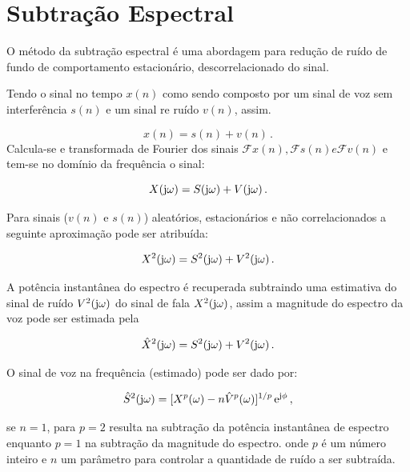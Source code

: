 \section{Subtração Espectral}
\label{secspec}
O método da subtração espectral é uma abordagem para redução de ruído de fundo de comportamento estacionário, descorrelacionado do sinal. 

Tendo o sinal no tempo $x(n)$ como sendo composto por um sinal de voz sem interferência $s(n)$ e um sinal re ruído $v(n)$, assim.

\begin{equation}
    x(n) = s(n)+v(n) \,.
    \label{eq1}
\end{equation}
\noindent
Calcula-se e transformada de Fourier dos sinais $\mathscr{F}{x(n)}, \mathscr{F}{s(n)} e\mathscr{F}{v(n)}   $ e tem-se no domínio da frequência o sinal: 

\begin{equation}
    X(\operatorname{j\!} \omega) = S(\operatorname{j\!} \omega)+V(\operatorname{j\!} \omega) \,.
    \label{eq2}
\end{equation}

Para sinais ($v(n)$ e $s(n)$) aleatórios, estacionários e não correlacionados a seguinte aproximação pode ser atribuída:

\begin{equation}
    X^2(\operatorname{j\!} \omega) = S^2(\operatorname{j\!} \omega)+V^2(\operatorname{j\!} \omega) \,.
    \label{eq3}
\end{equation}

A potência instantânea do espectro é recuperada subtraindo uma estimativa do sinal de ruído $V^2(\operatorname{j\!} \omega)$ do sinal de fala $X^2(\operatorname{j\!} \omega)$, assim a magnitude do espectro da voz pode ser estimada pela 

\begin{equation}
   \hat{X}^2(\operatorname{j\!} \omega) = S^2(\operatorname{j\!} \omega)+V^2(\operatorname{j\!} \omega) \,.
    \label{eq4}
\end{equation}

O sinal de voz na frequência (estimado) pode ser dado por:

\begin{equation}
    \hat{S}^2(\operatorname{j\!} \omega) = [X^p(\omega)-n\hat{V}^p(\omega)]^{1/p}\operatorname{e}^{\operatorname{j\!} \phi} \,,
    \label{eq5}
\end{equation}

se $n = 1$, para $p = 2$ resulta na subtração da potência instantânea de espectro enquanto $p = 1$ na subtração da magnitude do espectro.
\noindent 
onde $p$ é um número inteiro e $n$ um parâmetro para controlar a quantidade de ruído a ser subtraída.

